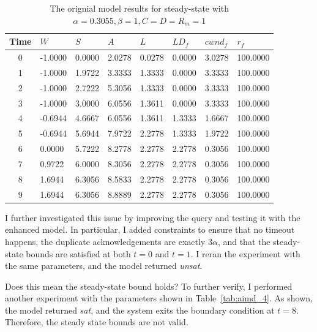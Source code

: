 \documentclass[12pt]{l4dc2023}
\begin{document}
\begin{table}[htbp]
\centering
\begin{tabular}{|c|l|l|l|l|l|l|l|}
\hline
\textbf{Time} & \textbf{$W$} & \textbf{$S$} & \textbf{$A$} & \textbf{$L$} & \textbf{$LD_f$} & \textbf{$cwnd_f$} & \textbf{$r_f$} \\
\hline
0 & -1.0000 & 0.0000 & 2.0278 & 0.0278 & 0.0000 & 3.0278 & 100.0000 \\
1 & -1.0000 & 1.9722 & 3.3333 & 1.3333 & 0.0000 & 3.3333 & 100.0000 \\
2 & -1.0000 & 2.7222 & 5.3056 & 1.3333 & 0.0000 & 3.3333 & 100.0000 \\
3 & -1.0000 & 3.0000 & 6.0556 & 1.3611 & 0.0000 & 3.3333 & 100.0000 \\
4 & -0.6944 & 4.6667 & 6.0556 & 1.3611 & 1.3333 & 1.6667 & 100.0000 \\
5 & -0.6944 & 5.6944 & 7.9722 & 2.2778 & 1.3333 & 1.9722 & 100.0000 \\
6 & 0.0000  & 5.7222 & 8.2778 & 2.2778 & 2.2778 & 0.3056 & 100.0000 \\
7 & 0.9722  & 6.0000 & 8.3056 & 2.2778 & 2.2778 & 0.3056 & 100.0000 \\
8 & 1.6944  & 6.3056 & 8.5833 & 2.2778 & 2.2778 & 0.3056 & 100.0000 \\
9 & 1.6944  & 6.3056 & 8.8889 & 2.2778 & 2.2778 & 0.3056 & 100.0000 \\
\hline
\end{tabular}
\caption{The orignial model results for steady-state with $\alpha=0.3055, \beta=1, C=D=R_m=1$}
\label{tab:aimd_3}
\end{table}

I further investigated this issue by improving the query and testing it with the enhanced model.  In particular, I added constraints to ensure that no timeout happens, the duplicate acknowledgements are exactly \(3\alpha\), and that the steady-state bounds are satisfied at both \(t=0\) and \(t=1\). I reran the experiment with the same parameters, and the model returned \emph{unsat}.  

Does this mean the steady-state bound holds? To further verify, I performed another experiment with the parameters shown in Table~\ref{tab:aimd_4}. As shown, the model returned \emph{sat}, and the system exits the boundary condition at \(t=8\).
Therefore, the steady state bounds are not valid.
\end{document}

